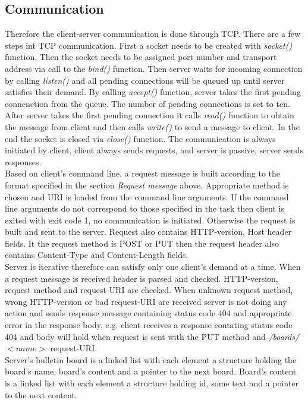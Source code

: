 \documentclass[11pt, a4paper]{article}
\begin{document}
	\subsection{Communication}
	 \cite{Fiel:rfc2616} Therefore the client-server communication is done through TCP. There are a few steps int TCP 		communication. First a socket needs to be created with \textit{socket()} function. Then the socket needs to be assigned port number and transport address via call to the 		\textit{bind()} function. Then server waits for incoming connection by calling \textit{listen()} and all pending connections will be queued up until server satisfies 		their demand. By calling \textit{accept()} function, server takes the first pending connenction from the queue. The number of pending connections is set to ten.
	After server takes the first pending connection it calls \textit{read()} function to obtain the message from client and then calls \textit{write()} to send a message to client.
	In the end the socket is closed via \textit{close()} function. The communication is always initiated by client, client always sends requests, and server is passive, 		server sends responses. \\
	Based on client's command line, a request message is built according to the format specified in the section \textit{Request message} above. Appropriate method is chosen and 		URI is loaded
	from the command line arguments. If the command line arguments do not correspond to those specified in the task then client is exited with exit code 1, no communication
	is initiated. Otherwise the request is built and sent to the server. Request also contains HTTP-version, Host header fields. It the request method is POST or PUT then
	the request header also contains Content-Type and Content-Length fields. \\
	Server is iterative therefore can satisfy only one client's demand at a time. When a request message is received header is parsed and checked. HTTP-version, request 		method and request-URI are checked. When unknown request method, wrong HTTP-version or bad request-URI are received server is not doing any action and sends response 		message containing status code 404 and appropriate error in the response body, e.g. client receives a response contating status code 404 and body will hold 
	 when request is sent with the PUT method and \textit{/boards/$<name>$} request-URI. \\
	Server's bulletin board is a linked list with each element a structure holding the board's name, board's content and a pointer to the next board. Board's content is a 		linked list with each element a structure holding id, some text and a pointer to the next content. \\
\end{document}

